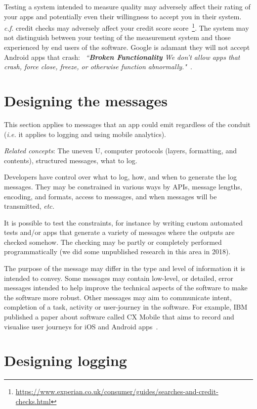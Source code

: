 Testing a system intended to measure quality may adversely affect their rating of your apps and potentially even their willingness to accept you in their system. \emph{c.f.} credit checks may adversely affect your credit score score~\footnote{\url{https://www.experian.co.uk/consumer/guides/searches-and-credit-checks.html}}. The system may not distinguish between your testing of the measurement system and those experienced by end users of the software. Google is adamant they will not accept Android apps that crash: ~\emph{``\textbf{Broken Functionality} We don’t allow apps that crash, force close, freeze, or otherwise function abnormally."}~\cite{google_play_developer_policy_center}.

\section{Designing the messages}
This section applies to messages that an app could emit regardless of the conduit (\emph{i.e.} it applies to logging and using mobile analytics).

\emph{Related concepts}: The uneven U, computer protocols (layers, formatting, and contents), structured messages, what to log. %

Developers have control over what to log, how, and when to generate the log messages. They may be constrained in various ways by APIs, message lengths, encoding, and formats, access to messages, and when messages will be transmitted, \emph{etc.} 

It is possible to test the constraints, for instance by writing custom automated tests and/or apps that generate a variety of messages where the outputs are checked somehow. The checking may be partly or completely performed programmatically (we did some unpublished research in this area in 2018).

The purpose of the message may differ in the type and level of information it is intended to convey. Some messages may contain low-level, or detailed, error messages intended to help improve the technical aspects of the software to make the software more robust. Other messages may aim to communicate intent, completion of a task, activity or user-journey in the software. For example, IBM published a paper about software called CX Mobile that aims to record and visualise user journeys for iOS and Android apps~\cite{hu_tealeaf_cxmobile}.

\section{Designing logging}
